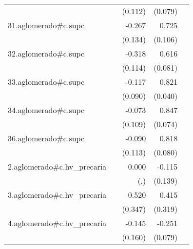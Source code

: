 {\begin{longtable}{l*{4}{D{.}{.}{-1}}}
            &                     &     (0.112)         &     (0.079)         &                     \\
\addlinespace
31.aglomerado#c.supc&                     &      -0.267\sym{*}  &       0.725\sym{***}&                     \\
            &                     &     (0.134)         &     (0.106)         &                     \\
\addlinespace
32.aglomerado#c.supc&                     &      -0.318\sym{**} &       0.616\sym{***}&                     \\
            &                     &     (0.114)         &     (0.081)         &                     \\
\addlinespace
33.aglomerado#c.supc&                     &      -0.117         &       0.821\sym{***}&                     \\
            &                     &     (0.090)         &     (0.040)         &                     \\
\addlinespace
34.aglomerado#c.supc&                     &      -0.073         &       0.847\sym{***}&                     \\
            &                     &     (0.109)         &     (0.074)         &                     \\
\addlinespace
36.aglomerado#c.supc&                     &      -0.090         &       0.818\sym{***}&                     \\
            &                     &     (0.113)         &     (0.080)         &                     \\
\addlinespace
2.aglomerado#c.hv\_precaria&                     &       0.000         &      -0.115         &                     \\
            &                     &         (.)         &     (0.139)         &                     \\
\addlinespace
3.aglomerado#c.hv\_precaria&                     &       0.520         &       0.415         &                     \\
            &                     &     (0.347)         &     (0.319)         &                     \\
\addlinespace
4.aglomerado#c.hv\_precaria&                     &      -0.145         &      -0.251\sym{**} &                     \\
            &                     &     (0.160)         &     (0.079)         &                     \\

\end{longtable}}
